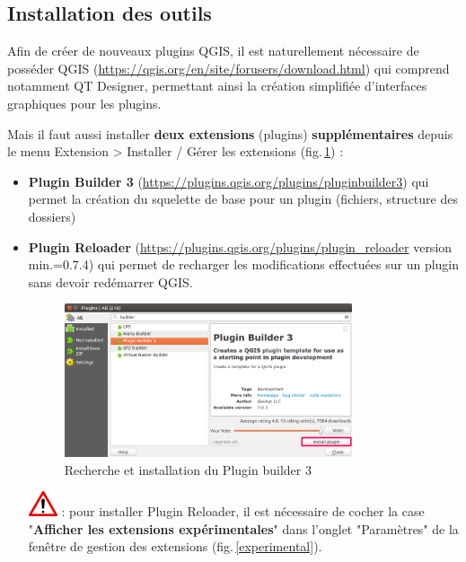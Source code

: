 \documentclass[11pt]{article}
\begin{document}
\subsection{Installation des outils}
\label{InstallationDesOutils}

Afin de créer de nouveaux plugins QGIS, il est naturellement nécessaire de posséder QGIS (\url{https://qgis.org/en/site/forusers/download.html}) qui comprend notamment QT Designer, permettant ainsi la création simplifiée d'interfaces graphiques pour les plugins. \vspace*{0.2em}

Mais il faut aussi installer \textbf{deux extensions} (plugins) \textbf{supplémentaires} depuis le menu \og{}Extension\fg{} >{} \og{}Installer / Gérer les extensions\fg{} (fig.\,\ref{extensions}) : \vspace*{0.2em}

\begin{itemize}\itemsep0.2em
\renewcommand\labelitemi{\---}
\item \og{}\textbf{Plugin Builder 3}\fg{} (\url{https://plugins.qgis.org/plugins/pluginbuilder3}) qui permet la création du squelette de base pour un plugin (fichiers, structure des dossiers)
\item \og{}\textbf{Plugin Reloader}\fg{} (\url{https://plugins.qgis.org/plugins/plugin_reloader} version min.=0.7.4) qui permet de recharger les modifications effectuées sur un plugin sans devoir redémarrer QGIS.


\vspace*{-0.2em}
\begin{figure}[H]
	\centering
    \includegraphics[width=0.8\textwidth]{plugin_builder_install.png}
    \vspace*{-0.4em}
	\caption{Recherche et installation du \og{}Plugin builder 3\fg{}}
    \label{extensions}
\end{figure}


\includegraphics[scale=1]{warningt.png} \underline{}: pour installer \og{}Plugin Reloader\fg{}, il est nécessaire de cocher la case "\textbf{Afficher les extensions expérimentales}" dans l'onglet "Paramètres" de la fenêtre de gestion des extensions (fig.\,\ref{experimental}).
\end{itemize} 
\vspace{1em}
\end{document}
